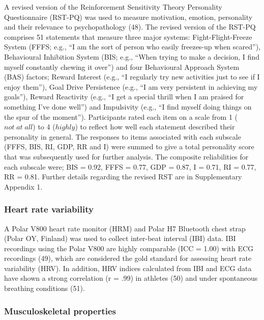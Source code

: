 \documentclass[
  english,
  man]{apa6}
\begin{document}
A revised version of the Reinforcement Sensitivity Theory Personality Questionnaire (RST-PQ) was used to measure motivation, emotion, personality and their relevance to psychopathology (48).
The revised version of the RST-PQ comprises 51 statements that measure three major systems: Fight-Flight-Freeze System (FFFS; e.g., ``I am the sort of person who easily freezes-up when scared''), Behavioural Inhibition System (BIS; e.g., ``When trying to make a decision, I find myself constantly chewing it over'') and four Behavioural Approach System (BAS) factors; Reward Interest (e.g., ``I regularly try new activities just to see if I enjoy them''), Goal Drive Persistence (e.g., ``I am very persistent in achieving my goals''), Reward Reactivity (e.g., ``I get a special thrill when I am praised for something I've done well'') and Impulsivity (e.g., ``I find myself doing things on the spur of the moment'').
Participants rated each item on a scale from 1 (\(not\; at\; all\)) to 4 (\(highly\)) to reflect how well each statement described their personality in general.
The responses to items associated with each subscale (FFFS, BIS, RI, GDP, RR and I) were summed to give a total personality score that was subsequently used for further analysis.
The composite reliabilities for each subscale were; BIS = 0.92, FFFS = 0.77, GDP = 0.87, I = 0.71, RI = 0.77, RR = 0.81.
Further details regarding the revised RST are in Supplementary Appendix 1.

\hypertarget{heart-rate-variability}{%
\subsubsection{Heart rate variability}\label{heart-rate-variability}}

A Polar V800 heart rate monitor (HRM) and Polar H7 Bluetooth chest strap (Polar OY, Finland) was used to collect inter-beat interval (IBI) data.
IBI recordings using the Polar V800 are highly comparable (ICC = 1.00) with ECG recordings (49), which are considered the gold standard for assessing heart rate variability (HRV).
In addition, HRV indices calculated from IBI and ECG data have shown a strong correlation (r = .99) in athletes (50) and under spontaneous breathing conditions (51).

\hypertarget{musculoskeletal-properties}{%
\subsubsection{Musculoskeletal properties}\label{musculoskeletal-properties}}
\end{document}
